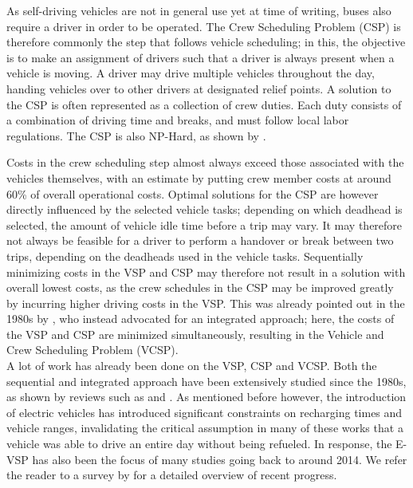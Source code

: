 \documentclass[]{article}
\begin{document}
As self-driving vehicles are not in general use yet at time of writing, buses also require a driver in order to be operated. The Crew Scheduling Problem (CSP) is therefore commonly the step that follows vehicle scheduling; in this, the objective is to make an assignment of drivers such that a driver is always present when a vehicle is moving. A driver may drive multiple vehicles throughout the day, handing vehicles over to other drivers at designated relief points. A solution to the CSP is often represented as a collection of crew duties. Each duty consists of a combination of driving time and breaks, and must follow local labor regulations. The CSP is also NP-Hard, as shown by \citet{Fischetti1989}.

Costs in the crew scheduling step almost always exceed those associated with the vehicles themselves, with an estimate by \citet{Perumal2019Crew} putting crew member costs at around 60\% of overall operational costs. Optimal solutions for the CSP are however directly influenced by the selected vehicle tasks; depending on which deadhead is selected, the amount of vehicle idle time before a trip may vary. It may therefore not always be feasible for a driver to perform a handover or break between two trips, depending on the deadheads used in the vehicle tasks. Sequentially minimizing costs in the VSP and CSP may therefore not result in a solution with overall lowest costs, as the crew schedules in the CSP may be improved greatly by incurring higher driving costs in the VSP. This was already pointed out in the 1980s by \citet{Bodin1983}, who instead advocated for an integrated approach; here, the costs of the VSP and CSP are minimized simultaneously, resulting in the Vehicle and Crew Scheduling Problem (VCSP). \\

\noindent A lot of work has already been done on the VSP, CSP and VCSP. Both the sequential and integrated approach have been extensively studied since the 1980s, as shown by reviews such as \citet{Ibarra-Rojas2015} and \citet{Ge2024}. As mentioned before however, the introduction of electric vehicles has introduced significant constraints on recharging times and vehicle ranges, invalidating the critical assumption in many of these works that a vehicle was able to drive an entire day without being refueled. In response, the E-VSP has also been the focus of many studies going back to around 2014. We refer the reader to a survey by \citet{Perumal2022LitRev} for a detailed overview of recent progress.
\end{document}
